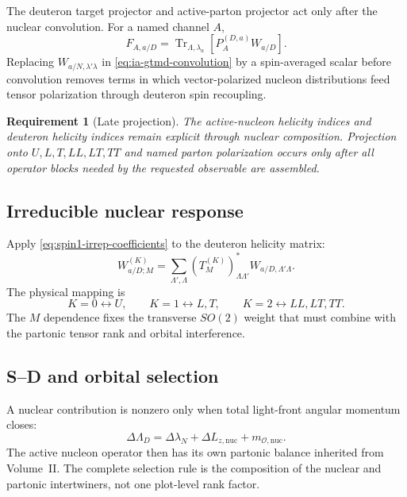 \documentclass[11pt]{article}
\newtheorem{requirement}[definition]{Requirement}
\newcommand{\Tr}{\operatorname{Tr}}
\newcommand{\cO}{\mathcal O}
\newcommand{\nuc}{\mathrm{nuc}}
\begin{document}
The deuteron target projector and active-parton projector act only after the
nuclear convolution.  For a named channel \(A\),
\begin{equation}
 F_{A,a/D}
 =\Tr_{\Lambda,\lambda_a}
 \left[
 P_{A}^{(D,a)}
 W_{a/D}
 \right].
\label{eq:deuteron-tmd-projector}
\end{equation}
Replacing \(W_{a/N,\lambda'\lambda}\) in
\cref{eq:ia-gtmd-convolution} by a spin-averaged scalar before convolution
removes terms in which vector-polarized nucleon distributions feed tensor
polarization through deuteron spin recoupling.

\begin{requirement}[Late projection]
\label{req:late-spin-projection}
The active-nucleon helicity indices and deuteron helicity indices remain
explicit through nuclear composition.  Projection onto \(U,L,T,LL,LT,TT\)
and named parton polarization occurs only after all operator blocks needed by
the requested observable are assembled.
\end{requirement}

\subsection{Irreducible nuclear response}

Apply \cref{eq:spin1-irrep-coefficients} to the deuteron helicity matrix:
\begin{equation}
 W_{a/D;M}^{(K)}
 =\sum_{\Lambda',\Lambda}
 (T_M^{(K)})_{\Lambda\Lambda'}^*
 W_{a/D,\Lambda'\Lambda}.
\label{eq:deuteron-irrep-projection}
\end{equation}
The physical mapping is
\begin{equation}
 K=0\leftrightarrow U,
 \qquad
 K=1\leftrightarrow L,T,
 \qquad
 K=2\leftrightarrow LL,LT,TT.
\label{eq:irrep-physical-map}
\end{equation}
The \(M\) dependence fixes the transverse \(SO(2)\) weight that must combine
with the partonic tensor rank and orbital interference.

\subsection{S--D and orbital selection}

A nuclear contribution is nonzero only when total light-front angular
momentum closes:
\begin{equation}
 \Delta\Lambda_D
 =\Delta\lambda_N
 +\Delta L_{z,\nuc}
 +m_{\cO,\nuc}.
\label{eq:nuclear-jz-selection}
\end{equation}
The active nucleon operator then has its own partonic balance inherited from
Volume~II.  The complete selection rule is the composition of the nuclear and
partonic intertwiners, not one plot-level rank factor.
\end{document}
